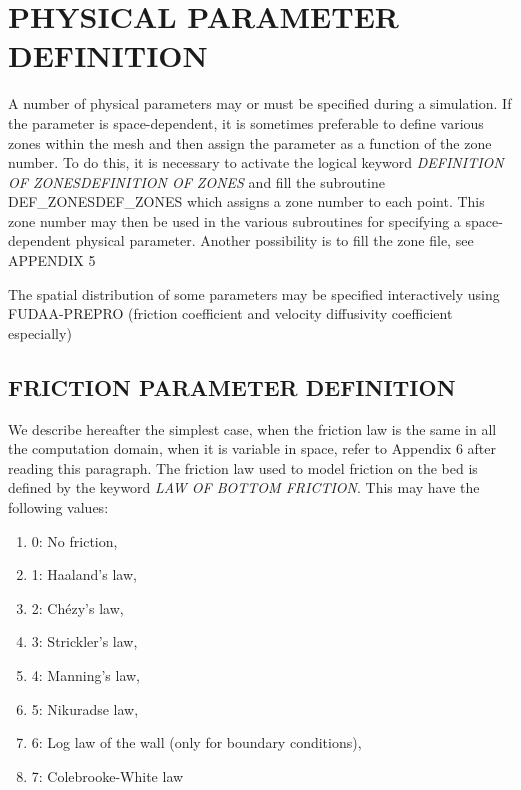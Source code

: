

\chapter{  PHYSICAL PARAMETER DEFINITION}

 A number of physical parameters may or must be specified during a simulation. If the parameter is space-dependent, it is sometimes preferable to define various zones within the mesh and then assign the parameter as a function of the zone number. To do this, it is necessary to activate the logical keyword \textit{DEFINITION OF ZONESDEFINITION OF ZONES} and fill the subroutine DEF\_ZONESDEF\_ZONES which assigns a zone number to each point. This zone number may then be used in the various subroutines for specifying a space-dependent physical parameter. Another possibility is to fill the zone file, see APPENDIX 5

 The spatial distribution of some parameters may be specified interactively using FUDAA-PREPRO (friction coefficient and velocity diffusivity coefficient especially)


\section{ FRICTION PARAMETER DEFINITION}

 We describe hereafter the simplest case, when the friction law is the same in all the computation domain, when it is variable in space, refer to Appendix 6 after reading this paragraph. The friction law used to model friction on the bed is defined by the keyword \textit{LAW OF BOTTOM FRICTION}. This may have the following values:

\begin{enumerate}
\item[\nonumber]  0: No friction,

\item [\nonumber] 1: Haaland's law,

\item [\nonumber] 2: Ch\'{e}zy's law,

\item[\nonumber]  3: Strickler's law,

\item[\nonumber]  4: Manning's law,

\item [\nonumber] 5: Nikuradse law,

\item [\nonumber] 6: Log law of the wall (only for boundary conditions),

\item [\nonumber] 7: Colebrooke-White law
\end{enumerate}

